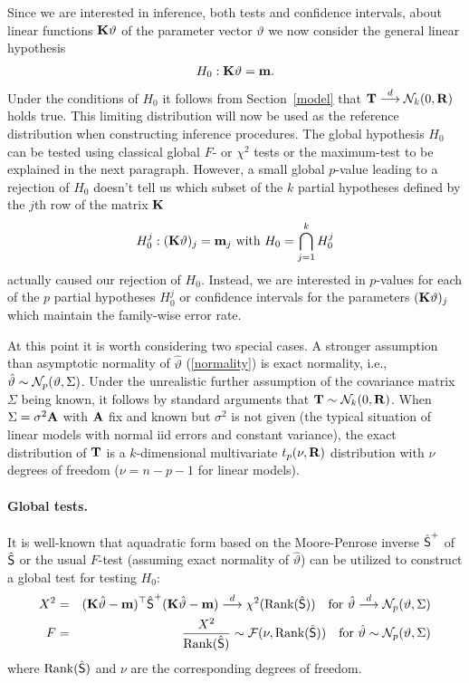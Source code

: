 \documentclass[12pt]{article}
\begin{document}
Since we are interested in inference, both tests and confidence
intervals, about linear functions $\K \vartheta$ of the parameter vector
$\vartheta$ we now consider the general linear hypothesis \citep{Searle1971}
\begin{eqnarray*}
H_0: \K \vartheta = \m.
\end{eqnarray*}
Under the conditions of $H_0$ it follows from Section~\ref{model} that 
$\T \cL \N_k(0, \Cor)$ holds true. This limiting distribution
will now be used as the reference distribution when constructing 
inference procedures.
The global hypothesis $H_0$ can be tested using classical
global $F$- or $\chi^2$ tests or the maximum-test to be explained
in the next paragraph. However, a small global $p$-value
leading to a rejection of $H_0$ doesn't tell us which subset of the
 $k$ partial hypotheses defined by the
$j$th row of the matrix $\K$
\begin{eqnarray*}
H_0^j: (\K\vartheta)_j = \m_j \text{ with } H_0 = \bigcap_{j = 1}^k H_0^j
\end{eqnarray*}
actually caused our rejection of $H_0$. Instead, we are interested
in $p$-values for each of the $p$ partial hypotheses $H_0^j$ or
confidence intervals for the parameters $(\K\vartheta)_j$ which
maintain the family-wise error rate.

At this point it is worth
considering two special cases. A stronger assumption than asymptotic normality
of $\hat{\vartheta}$ (\ref{normality}) is exact normality, i.e., 
$\hat{\vartheta} \sim \N_p(\vartheta, \Sigma)$. Under the unrealistic
further assumption of the covariance matrix $\Sigma$ being known, it
follows by standard arguments that $\T \sim \N_k(0, \Cor)$. 
When $\Sigma = \sigma^2 \A$ with $\A$ fix and known 
but $\sigma^2$ is not given (the typical situation of linear models
with normal iid errors and constant variance), the
exact distribution of $\T$ is a $k$-dimensional multivariate
$t_p(\nu, \Cor)$
distribution with $\nu$ degrees of freedom ($\nu = n - p - 1$ for linear models).

\paragraph{Global tests.}

It is well-known that aquadratic form based on the Moore-Penrose inverse $\hat{\S}^+$ of 
$\hat{\S}$ or the usual $F$-test (assuming exact normality of $\hat{\vartheta}$) 
can be utilized to construct a global test for testing $H_0$:
\begin{eqnarray*}
X^2 & = & (\K \hat{\vartheta} - \m)^\top \hat{\S}^+ (\K \hat{\vartheta} - \m) \cL \chi^2(\Rg(\hat{\S})) 
\quad \text{for } \hat{\vartheta} \cL \N_p(\vartheta, \Sigma) \\
F & = &  \frac{X^2}{\Rg(\hat{\S})} \sim \F(\nu, \Rg(\hat{\S})) \quad \text{for } 
\hat{\vartheta} \sim \N_p(\vartheta, \Sigma)
\end{eqnarray*}
where $\Rg(\hat{\S})$ and $\nu$ are the corresponding degrees of freedom.
\end{document}
